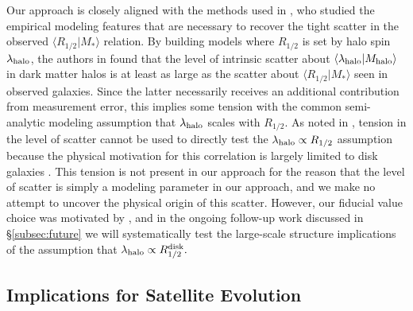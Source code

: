 \documentclass[usenatbib,usegraphicx,letterpaper]{mn2e}
\newcommand{\rhalf}{R_{1/2}}
\newcommand{\mstar}{M_{\ast}}
\newcommand{\mhalo}{M_{\rm halo}}
\newcommand{\rvir}{R_{\rm vir}}
\begin{document}
Our approach is closely aligned with the methods used in \citet{somerville_etal17}, who studied the empirical modeling features that are necessary to recover the tight scatter in the observed $\langle\rhalf\vert\mstar\rangle$ relation. By building models where $\rhalf$ is set by halo spin $\lambda_{\rm halo}$, the authors in \citet{somerville_etal17} found that the level of intrinsic scatter about $\langle\lambda_{\rm halo}\vert\mhalo\rangle$ in dark matter halos is at least as large as the scatter about $\langle\rhalf\vert\mstar\rangle$ seen in observed galaxies. Since the latter necessarily receives an additional contribution from measurement error, this implies some tension with the common semi-analytic modeling assumption that $\lambda_{\rm halo}$ scales with $\rhalf.$ As noted in \citet{somerville_etal17}, tension in the level of scatter cannot be used to directly test the $\lambda_{\rm halo}\propto\rhalf$ assumption because the physical motivation for this correlation is largely limited to disk galaxies \citep{mo_mao_white98}. This tension is not present in our approach for the reason that the level of scatter is simply a modeling parameter in our approach, and we make no attempt to uncover the physical origin of this scatter. However, our fiducial value choice was motivated by \citet{somerville_etal17}, and in the ongoing follow-up work discussed in \S\ref{subsec:future} we will systematically test the large-scale structure implications of the assumption that $\lambda_{\rm halo}\propto\rhalf^{\rm disk}.$

\subsection{Implications for Satellite Evolution}
\label{subsec:satellite_discussion}

\end{document}
